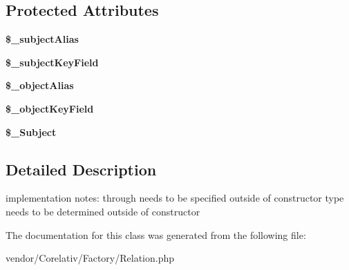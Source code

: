\subsection*{Protected Attributes}
\begin{DoxyCompactItemize}
\item 
\hypertarget{classRelation_aef5ea4977ddc9a5214834e54f85469a5}{
{\bfseries \$\_\-subjectAlias}}
\label{classRelation_aef5ea4977ddc9a5214834e54f85469a5}

\item 
\hypertarget{classRelation_a8f3e2c0a72231c3e5c737f6fbd7664a6}{
{\bfseries \$\_\-subjectKeyField}}
\label{classRelation_a8f3e2c0a72231c3e5c737f6fbd7664a6}

\item 
\hypertarget{classRelation_a9377ad6225ce23218f0f5d52b44232ad}{
{\bfseries \$\_\-objectAlias}}
\label{classRelation_a9377ad6225ce23218f0f5d52b44232ad}

\item 
\hypertarget{classRelation_a6b46ae9c16754b8b5be4001fb1f9abfc}{
{\bfseries \$\_\-objectKeyField}}
\label{classRelation_a6b46ae9c16754b8b5be4001fb1f9abfc}

\item 
\hypertarget{classRelation_a761d8f78bbd3f2a5851dcb7c8c3fc75b}{
{\bfseries \$\_\-Subject}}
\label{classRelation_a761d8f78bbd3f2a5851dcb7c8c3fc75b}

\end{DoxyCompactItemize}


\subsection{Detailed Description}
implementation notes: through needs to be specified outside of constructor type needs to be determined outside of constructor 

The documentation for this class was generated from the following file:\begin{DoxyCompactItemize}
\item 
vendor/Corelativ/Factory/Relation.php\end{DoxyCompactItemize}
